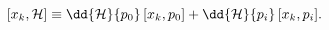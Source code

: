 \begin{equation}\label{9} [x_k,{\cal H}] \equiv \dd{{\cal H}}{p_0}\, [x_k, p_0] + \dd{{\cal H}}{p_i}\, [x_k,
  p_i].
\end{equation}

